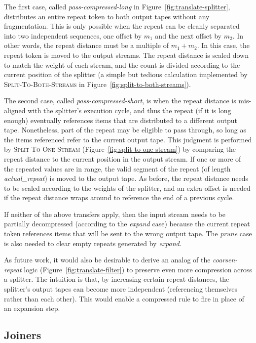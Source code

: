 The first case, called {\it pass-compressed-long} in
Figure~\ref{fig:translate-splitter}, distributes an entire repeat
token to both output tapes without any fragmentation.  This is only
possible when the repeat can be cleanly separated into two independent
sequences, one offset by $m_1$ and the next offset by $m_2$.  In other
words, the repeat distance must be a multiple of $m_1+m_2$.  In this
case, the repeat token is moved to the output streams.  The repeat
distance is scaled down to match the weight of each stream, and the
count is divided according to the current position of the splitter (a
simple but tedious calculation implemented
by \textsc{Split-To-Both-Streams} in Figure~\ref{fig:split-to-both-streams}).

The second case, called {\it pass-compressed-short}, is when the
repeat distance is mis-aligned with the splitter's execution cycle,
and thus the repeat (if it is long enough) eventually references items
that are distributed to a different output tape.  Nonetheless, part of
the repeat may be eligible to pass through, so long as the items
referenced refer to the current output tape.  This judgment is
performed by \textsc{Split-To-One-Stream}
(Figure~\ref{fig:split-to-one-stream}) by comparing the repeat distance to
the current position in the output stream.  If one or more of the
repeated values are in range, the valid segment of the repeat (of
length {\it actual\_repeat}) is moved to the output tape.  As before,
the repeat distance needs to be scaled according to the weights of the
splitter, and an extra offset is needed if the repeat distance wraps
around to reference the end of a previous cycle.

If neither of the above transfers apply, then the input stream needs
to be partially decompressed (according to the {\it expand} case)
because the current repeat token references items that will be sent to
the wrong output tape.  The {\it prune} case is also needed to clear
empty repeats generated by {\it expand}.

As future work, it would also be desirable to derive an analog of the
{\it coarsen-repeat} logic (Figure~\ref{fig:translate-filter}) to
preserve even more compression across a splitter.  The intuition is
that, by increasing certain repeat distances, the splitter's output
tapes can become more independent (referencing themselves rather than
each other).  This would enable a compressed rule to fire in place of
an expansion step.

\subsection*{Joiners}


